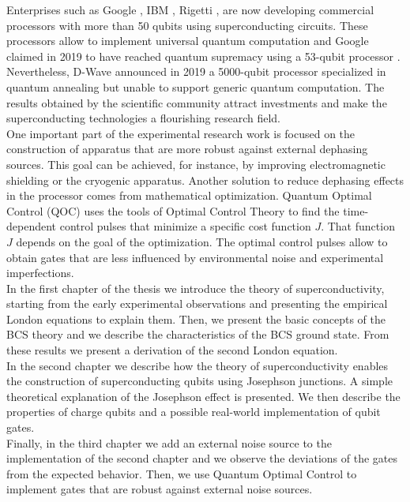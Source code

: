 \documentclass[../main/main.tex]{subfiles}
\begin{document}
Enterprises such as Google \cite{Castelvecchi2017google}, IBM \cite{Castelvecchi2017ibm}, Rigetti \cite{rigetti_computing_2021}, are now developing commercial processors with more than 50 qubits using superconducting circuits. These processors allow to implement universal quantum computation and Google claimed in 2019 to have reached quantum supremacy using a \mbox{53-qubit} processor \cite{google48651}. Nevertheless, D-Wave announced in 2019 a 5000-qubit processor \cite{dwave_5000q} specialized in quantum annealing but unable to support generic quantum computation. The results obtained by the scientific community attract investments and make the superconducting technologies a flourishing research field.\\
One important part of the experimental research work is focused on the construction of apparatus that are more robust against external dephasing sources. This goal can be achieved, for instance, by improving electromagnetic shielding or the cryogenic apparatus. Another solution to reduce dephasing effects in the processor comes from mathematical optimization. Quantum Optimal Control (QOC) \cite{Werschnik_2007,Glaser2015,boscain2020introduction} uses the tools of Optimal Control Theory to find the time-dependent control pulses that minimize a specific cost function $J$. That function $J$ depends on the goal of the optimization. The optimal control pulses allow to obtain gates that are less influenced by environmental noise and experimental imperfections.\\

In the first chapter of the thesis we introduce the theory of superconductivity, starting from the early experimental observations and presenting the empirical London equations to explain them. Then, we present the basic concepts of the BCS theory and we describe the characteristics of the BCS ground state. From these results we present a derivation of the second London equation.\\
In the second chapter we describe how the theory of superconductivity enables the construction of superconducting qubits using Josephson junctions. A simple theoretical explanation of the Josephson effect is presented. We then describe the properties of charge qubits and a possible real-world implementation of qubit gates.\\
Finally, in the third chapter we add an external noise source to the implementation of the second chapter and we observe the deviations of the gates from the expected behavior. Then, we use Quantum Optimal Control to implement gates that are robust against external noise sources.\\
\end{document}
